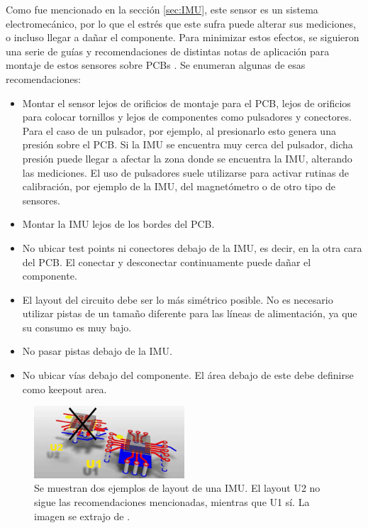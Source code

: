 Como fue mencionado en la sección \ref{sec:IMU}, este sensor es un sistema electromecánico, por lo que el estrés que este sufra puede alterar sus mediciones, o incluso llegar a dañar el componente. Para minimizar estos efectos, se siguieron una serie de guías y recomendaciones de distintas notas de aplicación para montaje de estos sensores sobre PCBs \cite{IMUpcb_1} \cite{IMUpcb_2} \cite{IMUpcb_3}. Se enumeran algunas de esas recomendaciones:


\begin{itemize}
    \item Montar el sensor lejos de orificios de montaje para el PCB, lejos de orificios para colocar tornillos y lejos de componentes como pulsadores y conectores. Para el caso de un pulsador, por ejemplo, al presionarlo esto genera una presión sobre el PCB. Si la IMU se encuentra muy cerca del pulsador, dicha presión puede llegar a afectar la zona donde se encuentra la IMU, alterando las mediciones. El uso de pulsadores suele utilizarse para activar rutinas de calibración, por ejemplo de la IMU, del magnetómetro o de otro tipo de sensores. %
    \item Montar la IMU lejos de los bordes del PCB.
    \item No ubicar test points ni conectores debajo de la IMU, es decir, en la otra cara del PCB. El conectar y desconectar continuamente puede dañar el componente.
    \item El layout del circuito debe ser lo más simétrico posible. No es necesario utilizar pistas de un tamaño diferente para las líneas de alimentación, ya que su consumo es muy bajo.
    \item No pasar pistas debajo de la IMU.
    \item No ubicar vías debajo del componente. El área debajo de este debe definirse como keepout area.
\end{itemize}

\begin{figure}[H]
    \centering
    \includegraphics[width=0.5\textwidth]{img/IMU_recomendaciones_layout.png}
    \caption{Se muestran dos ejemplos de layout de una IMU. El layout U2 no sigue las recomendaciones mencionadas, mientras que U1 sí. La imagen se extrajo de \cite{IMUpcb_3}.}
    \label{fig:IMU_recomendaciones_layout}
\end{figure}

